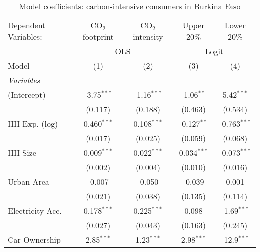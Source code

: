 
\begin{table}[htbp!]
   \centering
   \small
   \begin{adjustbox}{width = 1\textwidth, max height = 0.95\textheight, center}
      \begin{threeparttable}[b]
         \caption{\label{tab:Logit_1_BFA} Model coefficients: carbon-intensive consumers in Burkina Faso}
         \begin{tabular}{lcccc}
            \tabularnewline \midrule \midrule
            Dependent Variables: & CO$_{2}$ footprint & CO$_{2}$ intensity & Upper 20\%    & Lower 20\%\\   
             & \multicolumn{2}{c}{OLS} & \multicolumn{2}{c}{Logit} \\ 
            Model                & (1)                & (2)                & (3)           & (4)\\  
            \midrule
            \emph{Variables}\\
            (Intercept)          & -3.75$^{***}$      & -1.16$^{***}$      & -1.06$^{**}$  & 5.42$^{***}$\\   
                                 & (0.117)            & (0.188)            & (0.463)       & (0.534)\\   
            HH Exp. (log)        & 0.460$^{***}$      & 0.108$^{***}$      & -0.127$^{**}$ & -0.763$^{***}$\\   
                                 & (0.017)            & (0.025)            & (0.059)       & (0.068)\\   
            HH Size              & 0.009$^{***}$      & 0.022$^{***}$      & 0.034$^{***}$ & -0.073$^{***}$\\   
                                 & (0.002)            & (0.004)            & (0.010)       & (0.016)\\   
            Urban Area           & -0.007             & -0.050             & -0.039        & 0.001\\   
                                 & (0.021)            & (0.038)            & (0.135)       & (0.114)\\   
            Electricity Acc.     & 0.178$^{***}$      & 0.225$^{***}$      & 0.098         & -1.69$^{***}$\\   
                                 & (0.027)            & (0.043)            & (0.163)       & (0.245)\\   
            Car Ownership        & 2.85$^{***}$       & 1.23$^{***}$       & 2.98$^{***}$  & -12.9$^{***}$\\   

\end{tabular}
\end{threeparttable}
\end{adjustbox}
\end{table}
